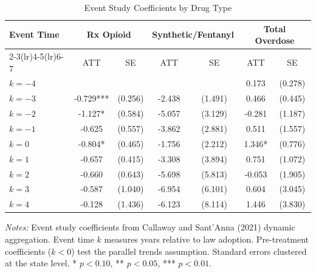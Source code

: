 \begin{table}[H]
\centering
\caption{Event Study Coefficients by Drug Type}
\begin{threeparttable}
\begin{tabular}{lcccccc}
\toprule
Event Time & \multicolumn{2}{c}{Rx Opioid} & \multicolumn{2}{c}{Synthetic/Fentanyl} & \multicolumn{2}{c}{Total Overdose} \\
\cmidrule(lr){2-3}\cmidrule(lr){4-5}\cmidrule(lr){6-7}
 & ATT & SE & ATT & SE & ATT & SE \\
\midrule
$k = -4$ & &  & &  & 0.173 & (0.278) \\
$k = -3$ & -0.729*** & (0.256) & -2.438 & (1.491) & 0.466 & (0.445) \\
$k = -2$ & -1.127* & (0.584) & -5.057 & (3.129) & -0.281 & (1.187) \\
$k = -1$ & -0.625 & (0.557) & -3.862 & (2.881) & 0.511 & (1.557) \\
$k = 0$ & -0.804* & (0.465) & -1.756 & (2.212) & 1.346* & (0.776) \\
$k = 1$ & -0.657 & (0.415) & -3.308 & (3.894) & 0.751 & (1.072) \\
$k = 2$ & -0.660 & (0.643) & -5.698 & (5.813) & -0.053 & (1.905) \\
$k = 3$ & -0.587 & (1.040) & -6.954 & (6.101) & 0.604 & (3.045) \\
$k = 4$ & -0.128 & (1.436) & -6.123 & (8.114) & 1.446 & (3.830) \\
\bottomrule
\end{tabular}
\begin{tablenotes}[flushleft]
\small
\item \textit{Notes:} Event study coefficients from Callaway and Sant'Anna (2021) dynamic aggregation. Event time $k$ measures years relative to law adoption. Pre-treatment coefficients ($k < 0$) test the parallel trends assumption. Standard errors clustered at the state level. * $p<0.10$, ** $p<0.05$, *** $p<0.01$.
\end{tablenotes}
\end{threeparttable}
\label{tab:event_study}
\end{table}
